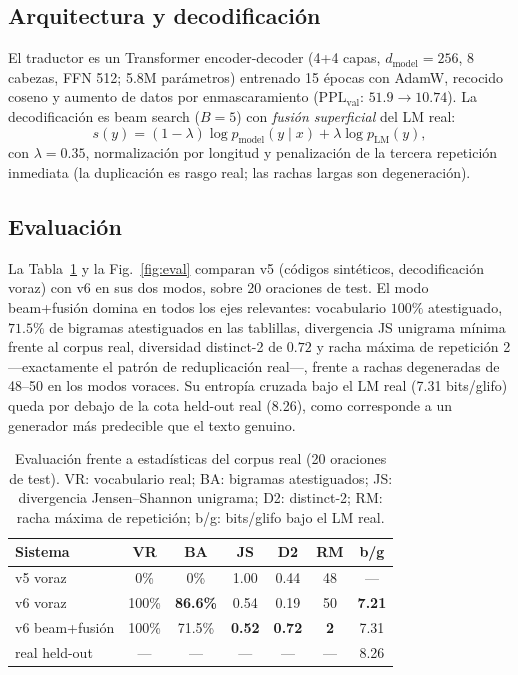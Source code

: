 \documentclass[10pt,twocolumn]{article}
\begin{document}
\subsection{Arquitectura y decodificación}

El traductor es un Transformer encoder-decoder (4+4 capas,
$d_{\mathrm{model}}{=}256$, 8 cabezas, FFN 512; 5.8M parámetros)
entrenado 15 épocas con AdamW, recocido coseno y aumento de datos por
enmascaramiento ($\mathrm{PPL}_{\mathrm{val}}$: $51.9\to10.74$). La
decodificación es beam search ($B{=}5$) con \emph{fusión superficial}
del LM real:
\begin{equation}
s(y)=(1-\lambda)\log p_{\mathrm{model}}(y\mid x)+\lambda\log
p_{\mathrm{LM}}(y),
\end{equation}
con $\lambda=0.35$, normalización por longitud y penalización de la
tercera repetición inmediata (la duplicación es rasgo real; las rachas
largas son degeneración).

\subsection{Evaluación}

La Tabla~\ref{tab:eval} y la Fig.~\ref{fig:eval} comparan v5 (códigos
sintéticos, decodificación voraz) con v6 en sus dos modos, sobre 20
oraciones de test. El modo beam+fusión domina en todos los ejes
relevantes: vocabulario $100\%$ atestiguado, $71.5\%$ de bigramas
atestiguados en las tablillas, divergencia JS unigrama mínima frente al
corpus real, diversidad distinct-2 de $0.72$ y racha máxima de
repetición 2 —exactamente el patrón de reduplicación real—, frente a
rachas degeneradas de 48--50 en los modos voraces. Su entropía cruzada
bajo el LM real (7.31 bits/glifo) queda por debajo de la cota held-out
real (8.26), como corresponde a un generador más predecible que el
texto genuino.

\begin{table}[t]
\centering
\small
\caption{Evaluación frente a estadísticas del corpus real (20 oraciones
de test). VR: vocabulario real; BA: bigramas atestiguados; JS:
divergencia Jensen--Shannon unigrama; D2: distinct-2; RM: racha máxima
de repetición; b/g: bits/glifo bajo el LM real.}
\label{tab:eval}
\begin{tabular}{lcccccc}
\toprule
Sistema & VR & BA & JS & D2 & RM & b/g\\
\midrule
v5 voraz & 0\% & 0\% & 1.00 & 0.44 & 48 & ---\\
v6 voraz & 100\% & \textbf{86.6\%} & 0.54 & 0.19 & 50 & \textbf{7.21}\\
v6 beam+fusión & 100\% & 71.5\% & \textbf{0.52} & \textbf{0.72} & \textbf{2} & 7.31\\
\midrule
real held-out & --- & --- & --- & --- & --- & 8.26\\
\bottomrule
\end{tabular}
\end{table}
\end{document}
